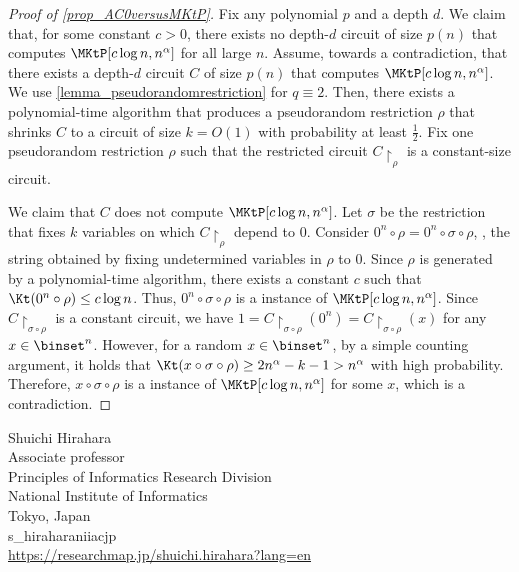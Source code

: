 \documentclass{toc}
\begin{document}
\begin{proof}
  [Proof of \cref{prop_AC0versusMKtP}]
  Fix any polynomial $p$ and a depth $d$.
  We claim that,
  for some constant $c > 0$,
  there exists no depth-$d$ circuit of size $p(n)$ that computes $\MKtP[c \log n, n^{\alpha}]$ for all large $n$.
  Assume, towards a contradiction, that there exists a depth-$d$ circuit $C$ of size $p(n)$ that computes $\MKtP[c \log n, n^{\alpha}]$.
  We use \cref{lemma_pseudorandomrestriction} for $q \equiv 2$.
  Then, there exists a polynomial-time algorithm that produces a pseudorandom restriction $\rho$ that shrinks $C$ to a circuit of size $k = O(1)$
  with probability at least $\frac{1}{2}$.
  Fix one pseudorandom restriction $\rho$ such that the restricted circuit $C\restriction_\rho$ is a constant-size circuit.

  We claim that $C$ does not compute $\MKtP[c \log n, n^{\alpha}]$.
  Let $\sigma$ be the restriction that fixes $k$ variables on which $C\restriction_\rho$ depend to $0$.
  Consider $0^n \circ \rho = 0^n \circ \sigma \circ \rho$, \ie, the string obtained by fixing undetermined variables in $\rho$ to $0$.
  Since $\rho$ is generated by a polynomial-time algorithm,
  there exists a constant $c$ such that $\Kt(0^n \circ \rho) \le c \log n$.
  Thus, $0^n \circ \sigma \circ \rho$ is a \Yes instance of $\MKtP[c \log n, n^{\alpha}]$.
  Since $C\restriction_{\sigma \circ \rho}$ is a constant circuit, we have $1 = C\restriction_{\sigma \circ \rho}(0^n) = C\restriction_{\sigma \circ \rho}(x)$
  for any $x \in \binset^n$.
  However, for a random $x \in \binset^n$,
  by a simple counting argument, it holds that $\Kt(x \circ \sigma \circ \rho) \ge 2 n^\alpha - k - 1 > n^\alpha$ with high probability.
  Therefore, $x \circ \sigma \circ \rho$ is a \No instance of $\MKtP[c \log n, n^{\alpha}]$ for some $x$, which is a contradiction.
\end{proof}




%
%
%
%
%


%
%
%
%
%
\begin{tocauthors}
  \begin{tocinfo}[hirahara]
    Shuichi Hirahara\\
    Associate professor\\
    Principles of Informatics Research Division\\
    National Institute of Informatics\\
    Tokyo, Japan\\
    s\_hirahara\tocat{}nii\tocdot{}ac\tocdot{}jp\\
    \url{https://researchmap.jp/shuichi.hirahara?lang=en}
  \end{tocinfo}
\end{tocauthors}
\end{document}
